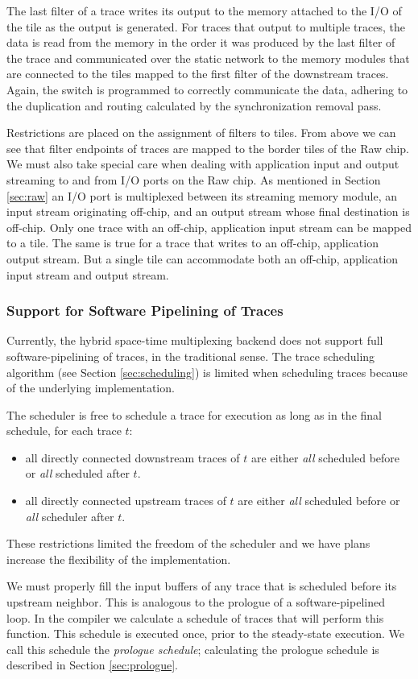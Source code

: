 The last filter of a trace writes its output to the memory attached to
the I/O of the tile as the output is generated. For traces that output
to multiple traces, the data is read from the memory in the order it
was produced by the last filter of the trace and communicated over the
static network to the memory modules that are connected to the tiles
mapped to the first filter of the downstream traces. Again, the switch
is programmed to correctly communicate the data, adhering to the
duplication and routing calculated by the synchronization removal
pass.

Restrictions are placed on the assignment of filters to tiles. From
above we can see that filter endpoints of traces are mapped to the
border tiles of the Raw chip. We must also take special care when
dealing with application input and output streaming to and from I/O
ports on the Raw chip.  As mentioned in Section \ref{sec:raw} an I/O
port is multiplexed between its streaming memory module, an input
stream originating off-chip, and an output stream whose final
destination is off-chip.  Only one trace with an off-chip, application
input stream can be mapped to a tile.  The same is true for a trace
that writes to an off-chip, application output stream.  But a single
tile can accommodate both an off-chip, application input stream and
output stream.

\subsubsection{Support for Software Pipelining of Traces}
\label{sec:softpipe}
Currently, the hybrid space-time multiplexing backend does not support
full software-pipelining of traces, in the traditional sense.  The
trace scheduling algorithm (see Section \ref{sec:scheduling}) is
limited when scheduling traces because of the underlying
implementation.

The scheduler is free to schedule a trace for execution as long as in
the final schedule, for each trace $t$:
\begin{itemize}
\item all directly connected downstream traces of $t$ are either {\it all}
scheduled before or {\it all} scheduled after $t$.
\item all directly connected upstream traces of $t$ are either {\it all}
scheduled before or {\it all} scheduler after $t$.
\end{itemize}
These restrictions limited the freedom of the scheduler and we have
plans increase the flexibility of the implementation.

We must properly fill the input buffers of any trace that is scheduled
before its upstream neighbor.  This is analogous to the prologue of a
software-pipelined loop.  In the compiler we calculate a schedule of
traces that will perform this function.  This schedule is executed
once, prior to the steady-state execution.  We call this schedule the
{\it prologue schedule}; calculating the prologue schedule is
described in Section \ref{sec:prologue}.
